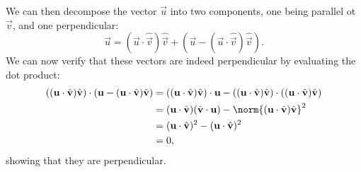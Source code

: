 We can then decompose the vector $\vec{u}$ into two components, one being parallel ot $\vec{v}$, and one perpendicular: \[
  \vec{u} = (\vec{u}\cdot \hat{\vec{v}})\hat{\vec{v}} + (\vec{u} - (\vec{u}\cdot \hat{\vec{v}})\hat{\vec{v}})
.\] 
We can now verify that these vectors are indeed perpendicular by evaluating the dot product:
\begin{align*}
  ((\vec{u}\cdot \hat{\vec{v}})\hat{\vec{v}})\cdot (\vec{u} - (\vec{u}\cdot \hat{\vec{v}})\hat{\vec{v}}) &= ((\vec{u}\cdot \hat{\vec{v}})\hat{\vec{v}})\cdot \vec{u} - ((\vec{u}\cdot \hat{\vec{v}})\hat{\vec{v}})\cdot ((\vec{u}\cdot \hat{\vec{v}})\hat{\vec{v}}) \\
                                                                                                         &= (\vec{u}\cdot \hat{\vec{v}})(\hat{\vec{v}}\cdot \vec{u}) - \norm{(\vec{u}\cdot \hat{\vec{v}})\hat{\vec{v}}}^2 \\
                                                                                                         &= (\vec{u}\cdot \hat{\vec{v}})^2 - (\vec{u}\cdot \hat{\vec{v}})^2 \\
                                                                                                         &= 0,
\end{align*} showing that they are perpendicular.
